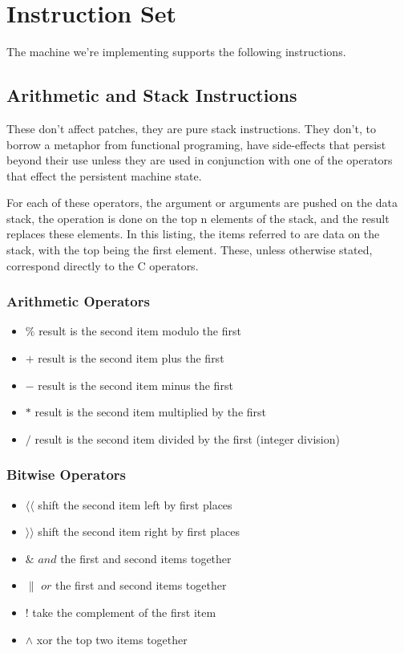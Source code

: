 \chapter{Instruction Set}
The machine we're implementing supports the following instructions.
\section{Arithmetic and Stack Instructions}
These don't affect patches, they are pure stack instructions. They don't, to borrow a metaphor from functional programing, have side-effects that persist beyond their use unless they are used in conjunction with one of the operators that effect the persistent machine state.

For each of these operators, the argument or arguments are pushed on the data stack, the operation is done on the top n elements of the stack, and the result replaces these elements. In this listing, the items referred to are data on the stack, with the top being the first element. These, unless otherwise stated, correspond directly to the C operators.
\subsection{Arithmetic Operators}
\begin{itemize}
\item $\%$ result is the second item modulo the first
\item $+$ result is the second item plus the first
\item $-$ result is the second item minus the first
\item $*$ result is the second item multiplied by the first
\item $/$ result is the second item divided by the first (integer division)
\end{itemize}

\subsection{Bitwise Operators}
\begin{itemize}
\item $\langle\langle$ shift the second item left by first places
\item $\rangle\rangle$ shift the second item right by first places
\item $\&$ $and$ the first and second items together
\item $\|$ $or$ the first and second items together
\item $!$ take the complement of the first item
\item $\wedge$ xor the top two items together
\end{itemize}

